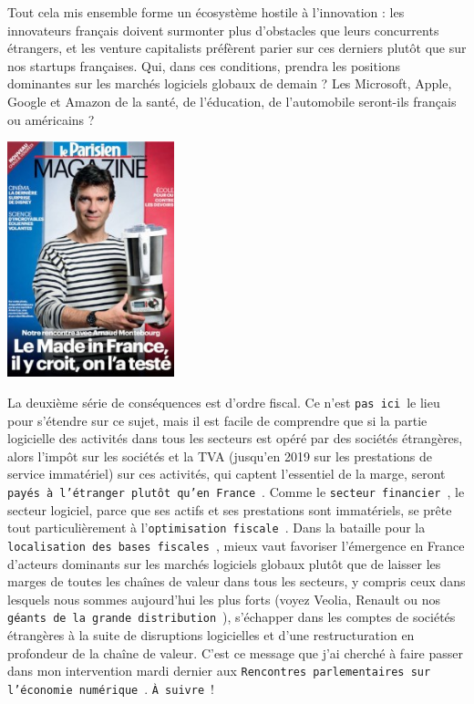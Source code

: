 \documentclass[11pt,twoside,a4paper]{article}
\begin{document}
\clearpage

Tout cela mis ensemble forme un {\'e}cosyst{\`e}me hostile {\`a} l'innovation : les innovateurs fran\c{c}ais doivent surmonter plus d'obstacles que leurs concurrents {\'e}trangers, et les venture capitalists pr{\'e}f{\`e}rent parier sur ces derniers plut{\^o}t que sur nos startups fran\c{c}aises. Qui, dans ces conditions, prendra les positions dominantes sur les march{\'e}s logiciels globaux de demain ? Les Microsoft, Apple, Google et Amazon de la sant{\'e}, de l'{\'e}ducation, de l'automobile seront-ils fran\c{c}ais ou am{\'e}ricains ? ~\\

\begin{minipage}[h]{5.00cm}
	\includegraphics[width=4.85cm]{img/1137572-213x300.jpg}
\end{minipage} \hfill \begin{minipage}[h]{14.00cm}
	La deuxi{\`e}me s{\'e}rie de cons{\'e}quences est d'ordre fiscal. Ce n'est \texttt{pas ici}~\footnotemark le lieu pour s'{\'e}tendre sur ce sujet, mais il est facile de comprendre que si la partie logicielle des activit{\'e}s dans tous les secteurs est op{\'e}r{\'e} par des soci{\'e}t{\'e}s {\'e}trang{\`e}res, alors l'imp{\^o}t sur les soci{\'e}t{\'e}s et la TVA (jusqu'en 2019 sur les prestations de service immat{\'e}riel) sur ces activit{\'e}s, qui captent l'essentiel de la marge, seront \texttt{pay{\'e}s {\`a} l'{\'e}tranger plut{\^o}t qu'en France}~\footnotemark. Comme le \texttt{secteur financier}~\footnotemark, le secteur logiciel, parce que ses actifs et ses prestations sont immat{\'e}riels, se pr{\^e}te tout particuli{\`e}rement {\`a} l'\texttt{optimisation fiscale}~\footnotemark. Dans la bataille pour la \texttt{localisation des bases fiscales}~\footnotemark, mieux vaut favoriser l'{\'e}mergence en France d'acteurs dominants sur les march{\'e}s logiciels globaux plut{\^o}t que de laisser les marges de toutes les cha{\^i}nes de valeur dans tous les secteurs, y compris ceux dans lesquels nous sommes aujourd'hui les plus forts (voyez Veolia, Renault ou nos \texttt{g{\'e}ants de la grande distribution}~\footnotemark), s'{\'e}chapper dans les comptes de soci{\'e}t{\'e}s {\'e}trang{\`e}res {\`a} la suite de disruptions logicielles et d'une restructuration en profondeur de la cha{\^i}ne de valeur. C'est ce message que j'ai cherch{\'e} {\`a} faire passer dans mon intervention mardi dernier aux \texttt{Rencontres parlementaires sur l'{\'e}conomie num{\'e}rique}~\footnotemark. \texttt{{\`A} suivre}~\footnotemark !
\end{minipage} ~\\
\end{document}

